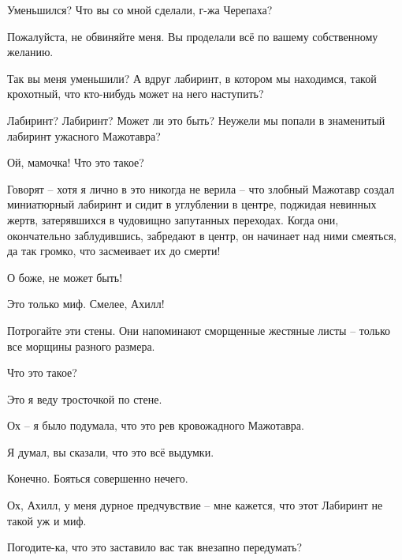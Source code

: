 \documentclass[../main.tex]{subfiles}
\begin{document}
\begin{Dialogue}
\begin{sublevel}
\begin{sublevel}
\begin{sublevel}
 Уменьшился? Что вы со мной сделали, г-жа Черепаха?

 Пожалуйста, не обвиняйте меня. Вы проделали всё по вашему собственному желанию.

 Так вы меня уменьшили? А вдруг лабиринт, в котором мы находимся, такой крохотный, что кто-нибудь может на него наступить?

 Лабиринт? Лабиринт? Может ли это быть? Неужели мы попали в знаменитый лабиринт ужасного Мажотавра?

 Ой, мамочка! Что это такое?

 Говорят \--- хотя я лично в это никогда не верила \--- что злобный Мажотавр создал миниатюрный лабиринт и сидит в углублении в центре, поджидая невинных жертв, затерявшихся в чудовищно запутанных переходах. Когда они, окончательно заблудившись, забредают в центр, он начинает над ними смеяться, да так громко, что засмеивает их до смерти!

 О боже, не может быть!

 Это только миф. Смелее, Ахилл!


 Потрогайте эти стены. Они напоминают сморщенные жестяные листы \--- только все морщины разного размера.


 Что это такое?

 Это я веду тросточкой по стене.

 Ох \--- я было подумала, что это рев кровожадного Мажотавра.

 Я думал, вы сказали, что это всё выдумки.

 Конечно. Бояться совершенно нечего.


 Ох, Ахилл, у меня дурное предчувствие \--- мне кажется, что этот Лабиринт не такой уж и миф.

 Погодите-ка, что это заставило вас так внезапно передумать?


\end{sublevel}
\end{sublevel}
\end{sublevel}
\end{Dialogue}
\end{document}
